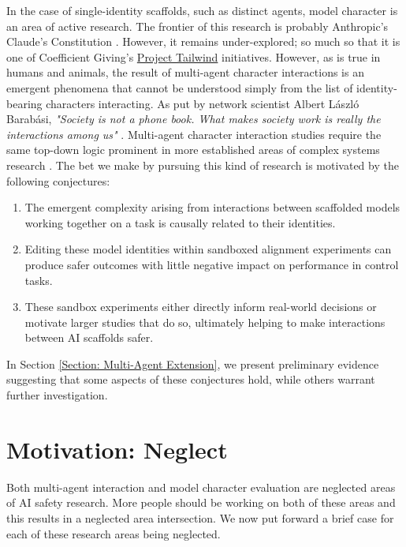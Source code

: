 \documentclass[11pt,a4paper]{article}
\begin{document}
In the case of single-identity scaffolds, such as distinct agents, model character is an area of active research. The frontier of this research is probably Anthropic's Claude’s Constitution \cite{anthropic2026claudeconstitution}. However, it remains under-explored; so much so that it is one of Coefficient Giving's \href{https://coefficientgiving.org/tailwind/initiatives/}{Project Tailwind} initiatives.  However, as is true in humans and animals, the result of multi-agent character interactions is an emergent phenomena that cannot be understood simply from the list of identity-bearing characters interacting. As put by network scientist Albert L\'aszl\'o Barab\'asi, \textit{"Society is not a phone book. What makes society work is really the interactions among us"} \cite{barabasi2023invisiblemath}. Multi-agent character interaction studies require the same top-down logic prominent in more established areas of complex systems research \cite{KOLT2025101341}. The bet we make by pursuing this kind of research is motivated by the following conjectures: 

\begin{enumerate}
[label=\Roman*)]
    \item The emergent complexity arising from interactions between scaffolded models working together on a task is causally related to their identities.
    \item Editing these model identities within sandboxed alignment experiments can produce safer outcomes with little negative impact on performance in control tasks.
    \item These sandbox experiments either directly inform real-world decisions or motivate larger studies that do so, ultimately helping to make interactions between AI scaffolds safer.
\end{enumerate} 

In Section \ref{Section: Multi-Agent Extension}, we present preliminary evidence suggesting that some aspects of these conjectures hold, while others warrant further investigation.

\section{Motivation: Neglect}
\label{neglect}

Both multi-agent interaction and model character evaluation are neglected areas of AI safety research. More people should be working on both of these areas and this results in a neglected area intersection. We now put forward a brief case for each of these research areas being neglected. 
\end{document}
